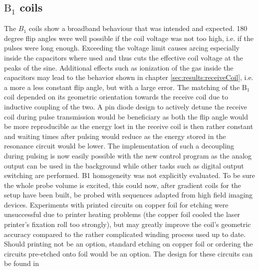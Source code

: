         \subsection{$\mathrm{B}_1$ coils}
        The $B_1$ coils show a broadband behaviour that was intended and expected. 180 degree flip angles were well possible if the coil voltage was not too high, i.e. if the pulses were long enough. Exceeding the voltage limit causes arcing especially inside the capacitors where used and thus cuts the effective coil voltage at the peaks of the sine. Additional effects such as ionization of the gas inside the capacitors may lead to the behavior shown in chapter \ref{sec:results:receiveCoil}, i.e. a more a less constant flip angle, but with a large error.
            The matching of the $\mathrm{B_1}$ coil depended on its geometric orientation towards the receive coil due to inductive coupling of the two. A pin diode design to actively detune the receive coil during pulse transmission would be beneficiary as both the flip angle would be more reproducible as the energy lost in the receive coil is then rather constant and waiting times after pulsing would reduce as the energy stored in the resonance circuit would be lower. The implementation of such a decoupling during pulsing is now easily possible with the new control program as the analog output can be used in the background while other tasks such as digital output switching are performed.
            B1 homogeneity was not explicitly evaluated. To be sure the whole probe volume is excited, this could now, after gradient coils for the setup have been built, be probed with sequences adapted from high field imaging devices.
            Experiments with printed circuits on copper foil for etching were unsuccessful due to printer heating problems (the copper foil cooled the laser printer's fixation roll too strongly), but may greatly improve the coil's geometric accuracy compared to the rather complicated winding process used up to date. Should printing not be an option, standard etching on copper foil or ordering the circuits pre-etched onto foil would be an option.  The design for these circuits can be found in 
